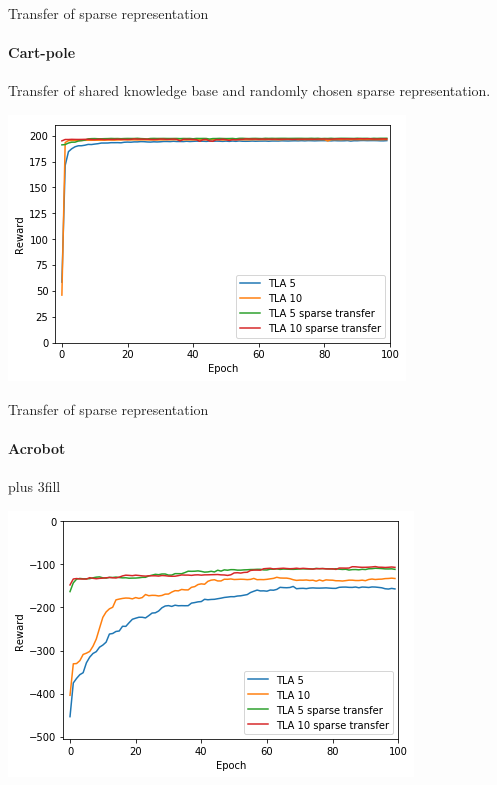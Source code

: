 \begin{frame}[fragile]{Transfer of sparse representation}
\framesubtitle{Cart-pole}
Transfer of shared knowledge base and randomly chosen sparse representation.
\begin{center}
    \includegraphics[width=.8\linewidth]{results/CartPole/sparse_transfer/reward_target_without_with.png}
\end{center}
\end{frame}

\begin{frame}[fragile]{Transfer of sparse representation}
\framesubtitle{Acrobot}
\vskip0pt plus 3fill
\begin{center}
    \includegraphics[width=.8\linewidth]{results/Acrobot/sparse_transfer/reward_target_without_with.png}
\end{center}
\end{frame}

